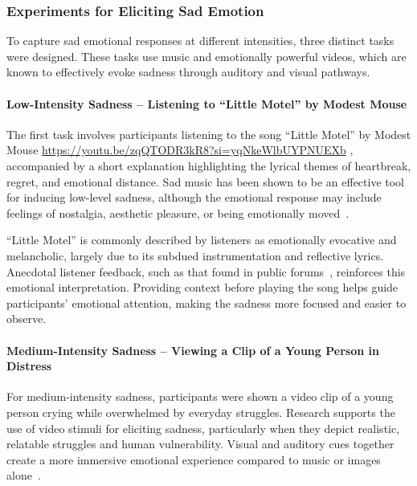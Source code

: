 \subsubsection{Experiments for Eliciting Sad Emotion}

To capture sad emotional responses at different intensities, three distinct tasks were designed. These tasks use music and emotionally powerful videos, which are known to effectively evoke sadness through auditory and visual pathways.

\paragraph*{Low-Intensity Sadness – Listening to “Little Motel” by Modest Mouse}

The first task involves participants listening to the song “Little Motel” by Modest Mouse \url{https://youtu.be/zqQTODR3kR8?si=yqNkeWlbUYPNUEXb} \citep{modest_mouse_little_motel}, accompanied by a short explanation highlighting the lyrical themes of heartbreak, regret, and emotional distance. Sad music has been shown to be an effective tool for inducing low-level sadness, although the emotional response may include feelings of nostalgia, aesthetic pleasure, or being emotionally moved~\citep{ribeiro2019emotional}.

“Little Motel” is commonly described by listeners as emotionally evocative and melancholic, largely due to its subdued instrumentation and reflective lyrics. Anecdotal listener feedback, such as that found in public forums~\cite{redditLittleMotel}, reinforces this emotional interpretation. Providing context before playing the song helps guide participants' emotional attention, making the sadness more focused and easier to observe.

\paragraph*{Medium-Intensity Sadness – Viewing a Clip of a Young Person in Distress}

For medium-intensity sadness, participants were shown a video clip of a young person crying while overwhelmed by everyday struggles. Research supports the use of video stimuli for eliciting sadness, particularly when they depict realistic, relatable struggles and human vulnerability. Visual and auditory cues together create a more immersive emotional experience compared to music or images alone~\citep{nojavanasghari2016emoreact}.

